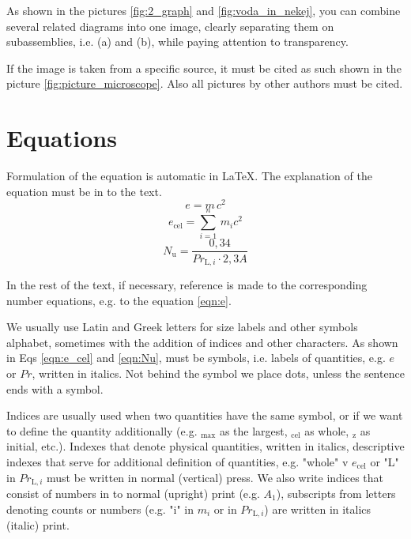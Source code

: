 As shown in the pictures \ref{fig:2_graph} and \ref{fig:voda_in_nekej}, you can
combine several related diagrams into one image, clearly separating them on
subassemblies, i.e. (a) and (b), while paying attention to transparency.

If the image is taken from a specific source, it must be cited as such
shown in the picture \ref{fig:picture_microscope}. Also all pictures by other authors
must be cited.

\section{Equations}\label{sec:equations}

Formulation of the equation is automatic in \LaTeX. The explanation of the equation must be in
to the text.
\begin{equation}\label{eqn:e}
e = m\,c^2
\end{equation}
\begin{equation}\label{eqn:e_cel}
e_{\text{cel}}=\sum_{i=1}^{n}\,m_{i}c^2
\end{equation}
\begin{equation}\label{eqn:Nu}
N_{\text{u}} = \frac{0{,}34}{Pr_{\text{L},i}\cdot 2{,}3A}
\end{equation}

In the rest of the text, if necessary, reference is made to the corresponding number
equations, e.g. to the equation \eqref{eqn:e}.

We usually use Latin and Greek letters for size labels and other symbols
alphabet, sometimes with the addition of indices and other characters. As shown in Eqs
\eqref{eqn:e_cel} and \eqref{eqn:Nu}, must be symbols, i.e. labels of quantities,
e.g. $e$ or $Pr$, written in italics. Not behind the symbol
we place dots, unless the sentence ends with a symbol.

Indices are usually used when two quantities have the same symbol, or if
we want to define the quantity additionally (e.g. $_{\text{max}}$ as the largest,
$_{\text{cel}}$ as whole, $_{\text{z}}$ as initial, etc.). Indexes that
denote physical quantities, written in italics, descriptive
indexes that serve for additional definition of quantities, e.g. "whole" v
$e_{\text{cel}}$ or "L" in $Pr_{\text{L},i}$ must be written in normal
(vertical) press. We also write indices that consist of numbers in
to normal (upright) print (e.g. $A_1$), subscripts from letters denoting counts
or numbers (e.g. "i" in $m_i$ or in $Pr_{\text{L},i}$) are written in italics
(italic) print.

